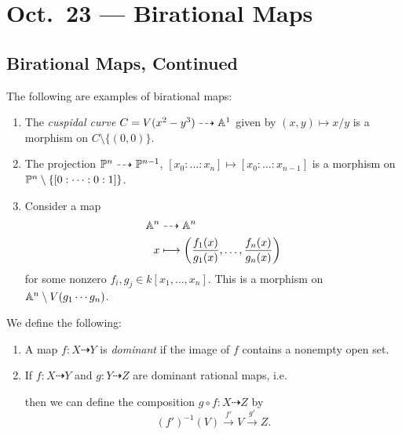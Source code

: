 \chapter{Oct.~23 --- Birational Maps}

\section{Birational Maps, Continued}

\begin{example}
  The following are examples of
  birational maps:
  \begin{enumerate}
    \item The \emph{cuspidal curve}
      $C = V(x^2 - y^3) \dashrightarrow \mathbb{A}^1$
      given by $(x, y) \mapsto x / y$ is
      a morphism on $C \setminus \{(0, 0)\}$.
    \item The projection
      $\mathbb{P}^n \dashrightarrow \mathbb{P}^{n - 1}$,
      $[x_0 : \dots : x_n] \mapsto [x_0 : \dots : x_{n - 1}]$
      is a morphism on
      $\mathbb{P}^n \setminus \{[0 : \dots : 0 : 1]\}$.
    \item Consider a map
      \begin{align*}
        \mathbb{A}^n &\dasharrow \mathbb{A}^n \\
        x &\longmapsto
        \left(
          \frac{f_1(x)}{g_1(x)},
          \dots,
          \frac{f_n(x)}{g_n(x)}
        \right)
      \end{align*}
      for some nonzero $f_i, g_j \in k[x_1, \dots, x_n]$.
      This is a morphism on
      $\mathbb{A}^n \setminus V(g_1 \cdots g_n)$.
  \end{enumerate}
\end{example}

\begin{definition}
  We define the following:
  \begin{enumerate}
    \item A map $f : X \dashrightarrow Y$
      is \emph{dominant} if the image
      of $f$ contains a nonempty open set.
    \item If $f : X \dashrightarrow Y$
      and $g : Y \dashrightarrow Z$
      are dominant rational maps, i.e.
      \begin{center}
      \end{center}
      then we can define the composition
      $g \circ f : X \dashrightarrow Z$
      by
      \[
        (f')^{-1}(V) \overset{f'}{\longrightarrow} V
        \overset{g'}{\longrightarrow} Z.
      \]
  \end{enumerate}
\end{definition}

